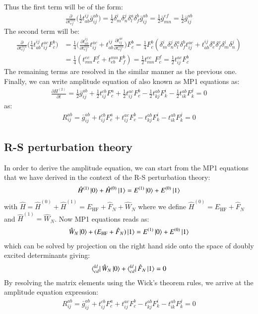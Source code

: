 \documentclass[journal=jacsat]{achemso}
\numberwithin{equation}{section}
\begin{document}
Thus the first term will be of the form:
\begin{align}
\frac{\partial }{\partial t^{mn}_{ef}}\bigg(\frac{1}{2}t^{ij}_{ab}\bar{g}^{ab}_{ij}\bigg)=\frac{1}{2}\delta^{i}_{m}\delta^{j}_{n}\delta^{a}_{l}\delta^{b}_{f}\bar{g}^{ab}_{ij}=\frac{1}{2}\bar{g}^{ef}_{mn}=\frac{1}{2}\bar{g}^{ab}_{ij}
\end{align}
The second term will be:
\begin{align}
\frac{\partial }{\partial t^{mn}_{ef}}\bigg(\frac{1}{4}t^{ij}_{ab}t^{ac}_{ij}F^{b}_{c}\bigg)&=\frac{1}{4}\bigg(\frac{\partial t^{ij}_{ab}}{\partial t^{mn}_{ef}}t^{ac}_{ij}+t^{ij}_{ab}\frac{\partial t^{ac}_{ij}}{\partial t^{mn}_{ef}}\bigg)F^{b}_{c}=\frac{1}{4}F^{b}_{c}(\delta^{i}_{m}\delta^{j}_{n}\delta^{a}_{l}\delta^{b}_{f}t^{ac}_{ij}+t^{ij}_{ab}\delta^{a}_{e}\delta^{c}_{f}\delta^{i}_{m}\delta^{j}_{n})\\\nonumber
&=\frac{1}{4}(t^{ec}_{mn}F^{f}_{c}+t^{mn}_{eb}F^{b}_{f})=\frac{1}{2}t^{ec}_{mn}F^{f}_{c}=\frac{1}{2}t^{ac}_{ij}F^{b}_{c}
\end{align}
The remaining terms are resolved in the similar manner as the previous one.
Finally, we can write amplitude equation of also known as MP1 equations as:
\begin{align}
\frac{\partial H^{(2)}}{\partial t}=\frac{1}{2}\bar{g}^{ab}_{ij}+\frac{1}{2}t^{cb}_{ij}F^{a}_{c}+\frac{1}{2}t^{ac}_{ij}F^{b}_{c}-\frac{1}{2}t^{ab}_{kj}F^{i}_{k}-\frac{1}{2}t^{ab}_{ik}F^{j}_{k}=0
\end{align}
as:
\begin{align}
R^{ab}_{ij}=\bar{g}^{ab}_{ij}+t^{cb}_{ij}F^{a}_{c}+t^{ac}_{ij}F^{b}_{c}-t^{ab}_{kj}F^{i}_{k}-t^{ab}_{ik}F^{j}_{k}=0
\end{align}

\subsection{R-S perturbation theory}
In order to derive the amplitude equation, we can start from the MP1 equations that we have derived in the context of the R-S perturbation theory:
\begin{align}
\hat{H}^{(1)}\ket{0}+\hat{H}^{(0)}\ket{1}=E^{(1)}\ket{0}+E^{(0)}\ket{1}
\end{align}
with $\hat{H}=\hat{H}^{(0)}+\hat{H}^{(1)}=E_{\text{HF}}+\hat{F}_{N}+\hat{W}_{N}$ where we define $\hat{H}^{(0)}=E_{\text{HF}}+\hat{F}_{N}$ and $\hat{H}^{(1)}=\hat{W}_{N}$. Now MP1 equations reads as:
\begin{align}
\hat{W}_{N}\ket{0}+(E_{\text{HF}}+\hat{F}_{N})\ket{1}=E^{(1)}\ket{0}+E^{(0)}\ket{1}
\end{align} 
which can be solved by projection on the right hand side onto the space of doubly excited determinants giving:
\begin{align}
\bra{^{kl}_{cd}}\hat{W}_{N}\ket{0}+\bra{^{kl}_{cd}}\hat{F}_{N}\ket{1}=0
\end{align}   
By resolving the matrix elements using the Wick's theorem rules, we arrive at the amplitude equation expression:
\begin{align}
R^{ab}_{ij}=\bar{g}^{ab}_{ij}+t^{cb}_{ij}F^{a}_{c}+t^{ac}_{ij}F^{b}_{c}-t^{ab}_{kj}F^{i}_{k}-t^{ab}_{ik}F^{j}_{k}=0
\end{align}
\end{document}
